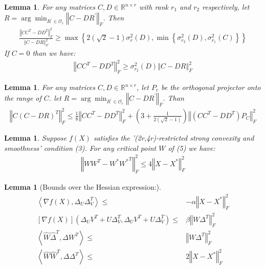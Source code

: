 \documentclass{article}
\newtheorem{lemma}[theorem]{Lemma}
\begin{document}
\begin{lemma} \label{lemma_3}
 For any matrices $C,D\in\mathbb{R}^{n\times r}$ with rank $r_1$ and $r_2$ respectively, let $R =\arg \min_{R^{'} \in\mathcal{O}_r}\left\Vert C-DR^{'}\right\Vert_F$. Then
 \begin{align*}
     \frac{\left\Vert CC^T-DD^T\right\Vert_F^2}{\left\Vert C-DR\right\Vert_F^2}\ge \max\left\{2\left(\sqrt{2}-1\right)\sigma_r^2\left(D\right),\min\left\{\sigma_{r_2}^2\left(D\right),\sigma_{r_1}^2\left(C\right)\right\}\right\}
 \end{align*}
If $C=0$ than we have:
\begin{align*}
    \left\Vert CC^T-DD^T\right\Vert_F^2\ge\sigma_{r_2}^2\left(D\right)\left\Vert C-DR\right\Vert_F^2
\end{align*}
\end{lemma}

\begin{lemma} \label{lemma_4}
 For any matrices $C,D\in\mathbb{R}^{n\times r}$, let $P_c$ be the orthogonal projector onto the range of $C$. let $R =\arg \min_{R^{'} \in\mathcal{O}_r}\left\Vert C-DR^{'}\right\Vert_F$. Than 
 \begin{align*}
     \left\Vert C\left(C-DR\right)^T\right\Vert^2_F\le\frac{1}{8}\left\Vert CC^T-DD^T\right\Vert^2_F + \left(3 + \frac{1}{2\left(\sqrt{2}- 1\right)}\right)\left\Vert \left(CC^T-DD^T\right)P_C\right\Vert^2_F
 \end{align*}
\end{lemma}

\begin{lemma} \label{lemma_5}
 Suppose $f\left(X\right)$ satisfies the '(2r,4r)-restricted strong convexity and smoothness' condition (3). For any critical point $W$ of (5) we have:
\begin{align*}
    \left\Vert WW^T-W^*{W^*}^T\right\Vert_F^2\le4\left\Vert X-X^*\right\Vert_F^2
\end{align*}
\end{lemma}

\begin{lemma}[Bounds over the Hessian expression:] \label{lemma_6}
\begin{align*}
    \left\langle \nabla f\left(X\right),\Delta_{U}\Delta_{V}^{T}\right\rangle \le & -\alpha\left\Vert X-X^*\right\Vert^2_F\\
    \left[\nabla f\left(X\right)\right]\left(\Delta_{U}V^{T}+U\Delta_{V}^{T},\Delta_{U}V^{T}+U\Delta_{V}^{T}\right) \le &\beta\left\Vert W\Delta^T\right\Vert^2_F\\
    \left\langle \hat{W}\hat{\Delta}^{T},\Delta W^{T}\right\rangle \le & \left\Vert W\Delta^T\right\Vert^2_F\\
    \left\langle \hat{W}\hat{W}^{T},\Delta\Delta^{T}\right\rangle \le & 2\left\Vert X-X^*\right\Vert^2_F
\end{align*}
\end{lemma}
\end{document}
